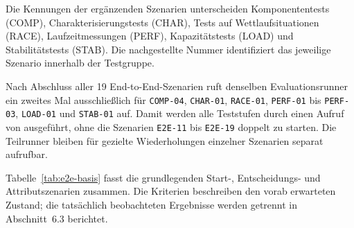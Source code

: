 Die Kennungen der ergänzenden Szenarien unterscheiden Komponententests (COMP),
Charakterisierungstests (CHAR), Tests auf Wettlaufsituationen (RACE), Laufzeitmessungen (PERF),
Kapazitätstests (LOAD) und Stabilitätstests (STAB). Die nachgestellte Nummer identifiziert das
jeweilige Szenario innerhalb der Testgruppe.

Nach Abschluss aller 19 End-to-End-Szenarien ruft  denselben Evaluationsrunner ein
zweites Mal ausschließlich für \texttt{COMP-04}, \texttt{CHAR-01}, \texttt{RACE-01},
\texttt{PERF-01} bis \texttt{PERF-03}, \texttt{LOAD-01} und \texttt{STAB-01} auf. Damit werden
alle Teststufen durch einen Aufruf von  ausgeführt, ohne die Szenarien
\texttt{E2E-11} bis \texttt{E2E-19} doppelt zu starten. Die Teilrunner bleiben für gezielte
Wiederholungen einzelner Szenarien separat aufrufbar.

Tabelle~\ref{tab:e2e-basis} fasst die grundlegenden Start-, Entscheidungs- und Attributszenarien
zusammen. Die Kriterien beschreiben den vorab erwarteten Zustand; die tatsächlich beobachteten
Ergebnisse werden getrennt in Abschnitt~6.3 berichtet.

